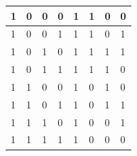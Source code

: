 \documentclass[11pt]{article}
\begin{document}
\begin{table}[H]
\begin{tabular}{|llll||llll|}
		\multicolumn{1}{|l|}{1}                    & \multicolumn{1}{l|}{0}                  & \multicolumn{1}{l|}{0}     & 0     & \multicolumn{1}{l|}{1}     & \multicolumn{1}{l|}{1}     & \multicolumn{1}{l|}{0}     & 0     \\ \hline
		\multicolumn{1}{|l|}{1}                    & \multicolumn{1}{l|}{0}                  & \multicolumn{1}{l|}{0}     & 1     & \multicolumn{1}{l|}{1}     & \multicolumn{1}{l|}{1}     & \multicolumn{1}{l|}{0}     & 1     \\ \hline
		\multicolumn{1}{|l|}{1}                    & \multicolumn{1}{l|}{0}                  & \multicolumn{1}{l|}{1}     & 0     & \multicolumn{1}{l|}{1}     & \multicolumn{1}{l|}{1}     & \multicolumn{1}{l|}{1}     & 1     \\ \hline
		\multicolumn{1}{|l|}{1}                    & \multicolumn{1}{l|}{0}                  & \multicolumn{1}{l|}{1}     & 1     & \multicolumn{1}{l|}{1}     & \multicolumn{1}{l|}{1}     & \multicolumn{1}{l|}{1}     & 0     \\ \hline
		\multicolumn{1}{|l|}{1}                    & \multicolumn{1}{l|}{1}                  & \multicolumn{1}{l|}{0}     & 0     & \multicolumn{1}{l|}{1}     & \multicolumn{1}{l|}{0}     & \multicolumn{1}{l|}{1}     & 0     \\ \hline
		\multicolumn{1}{|l|}{1}                    & \multicolumn{1}{l|}{1}                  & \multicolumn{1}{l|}{0}     & 1     & \multicolumn{1}{l|}{1}     & \multicolumn{1}{l|}{0}     & \multicolumn{1}{l|}{1}     & 1     \\ \hline
		\multicolumn{1}{|l|}{1}                    & \multicolumn{1}{l|}{1}                  & \multicolumn{1}{l|}{1}     & 0     & \multicolumn{1}{l|}{1}     & \multicolumn{1}{l|}{0}     & \multicolumn{1}{l|}{0}     & 1     \\ \hline
		\multicolumn{1}{|l|}{1}                    & \multicolumn{1}{l|}{1}                  & \multicolumn{1}{l|}{1}     & 1     & \multicolumn{1}{l|}{1}     & \multicolumn{1}{l|}{0}     & \multicolumn{1}{l|}{0}     & 0     \\ \hline
	\end{tabular}
\end{table}
\end{document}
